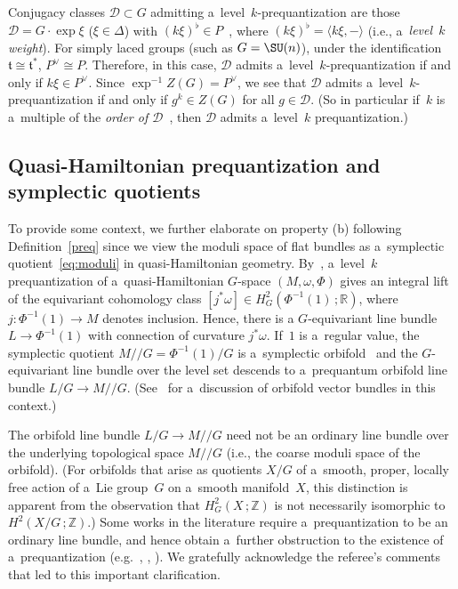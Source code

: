 \begin{Example}
Conjugacy classes $\mathcal{D} \subset G$ admitting a~level~$k$-prequantization are those $\mathcal{D}=G\cdot \exp \xi$
($\xi \in \Delta$) with $(k\xi)^\flat \in P$~\cite{BasicGerbe}, where $(k\xi)^\flat = \langle k\xi,- \rangle$ (i.e., a~\emph{level~$k$ weight}).
For simply laced groups (such as $G=\SU(n)$), under the identif\/ication $\mathfrak{t} \cong \mathfrak{t}^*$, $P^\vee
\cong P$.
Therefore, in this case, $\mathcal{D}$ admits a~level~$k$-prequantization if and only if $k\xi \in P^\vee$.
Since $\exp^{-1} Z(G) = P^\vee$, we see that $\mathcal{D}$ admits a~level~$k$-prequantization if and only if $g^k \in
Z(G)$ for all $g \in \mathcal{D}$.
(So in particular if~$k$ is a~multiple of the \emph{order of $\mathcal{D}$}~\cite[Def\/inition 5.76]{BL}, then
$\mathcal{D}$ admits a~level~$k$ prequantization.)
\end{Example}

\subsection{Quasi-Hamiltonian prequantization and symplectic quotients}\label{pqbundle}

To provide some context, we further elaborate on property (b) following Def\/inition~\ref{preq} since we view the moduli
space of f\/lat bundles as a~symplectic quotient~\eqref{eq:moduli} in quasi-Hamiltonian geometry.
By~\cite[Proposition~3.6]{JGP}, a~level~$k$ prequantization of a~quasi-Hamiltonian $G$-space $(M,\omega,\Phi)$ gives
an integral lift of the equivariant cohomology class $[j^*\omega] \in H^2_G(\Phi^{-1}(1)\,;{\mathbb{R}})$, where
$j:\Phi^{-1}(1) \to M$ denotes inclusion.
Hence, there is a $G$-equivariant line bundle $L\to \Phi^{-1}(1)$ with connection of curvature $j^*\omega$.
If~$1$ is a~regular value, the symplectic quotient $M/ /G= \Phi^{-1}(1)/G$ is a~symplectic orbifold~\cite{AMM} and
the $G$-equivariant line bundle over the level set descends to a~prequantum orbifold line bundle $L/G \to M/ /G$.
(See~\cite[Example 2.29]{Adem} for a~discussion of orbifold vector bundles in this context.)

\begin{Remark}
The orbifold line bundle $L/G\to M/ /G$ need not be an ordinary line bundle over the underlying topological space $M/
/G$ (i.e., the coarse moduli space of the orbifold).
(For orbifolds that arise as quotients $X/G$ of a~smooth, proper, locally free action of a~Lie group~$G$ on a~smooth
manifold~$X$, this distinction is apparent from the observation that $H_G^2(X\,;{\mathbb{Z}})$ is not necessarily
isomorphic to $H^2(X/G\,;{\mathbb{Z}})$.) Some works in the literature require a~prequantization to be an ordinary line
bundle, and hence obtain a~further obstruction to the existence of a~prequantization (e.g.~\cite[Theorem 4.2]{Ko},
\cite[Theorems~4.12 and~6.1]{DW}, \cite[Lemme~3.2]{Pa}).
We gratefully acknowledge the referee's comments that led to this important clarif\/ication.
\end{Remark}

